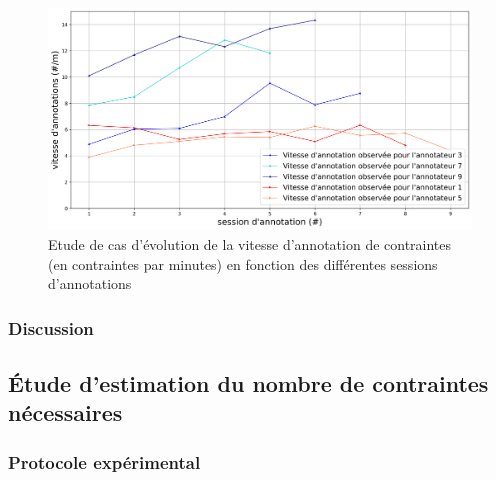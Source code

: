		
			\begin{figure}[!htb]
				\centering
				\includegraphics[width=\textwidth]{figures/etude-temps-annotation-3-etude-de-cas}
				\caption{Etude de cas d'évolution de la vitesse d'annotation de contraintes (en contraintes par minutes) en fonction des différentes sessions d'annotations}
				\label{figure:4.3.2-ETUDE-COUTS-TEMPS-ANNOTATION-EXEMPLE}
			\end{figure}

		\subsubsection{Discussion}
		
	
	\subsection{Étude d'estimation du nombre de contraintes nécessaires}
	\label{section:4.3.3-ETUDE-COUT-NOMBRE-CONTRAINTES}
	
		\subsubsection{Protocole expérimental}


